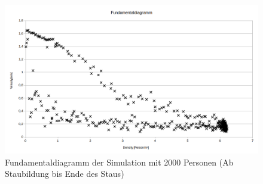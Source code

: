 \begin{figure}[ht]
	\centering
  \includegraphics[width=\textwidth]{abbildungen/engstelle/2000P/fundamentalDiagram2000personsALLDATA.png}
	\caption{Fundamentaldiagramm der Simulation mit 2000 Personen (Ab Staubildung bis Ende des Staus)}
	\label{fig:engstelle2000pFUNDAALL}
\end{figure}

